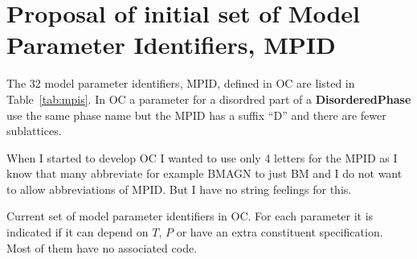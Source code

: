 \documentclass{article}
\begin{document}
\begin{appendices}
{\begin{verbatim}
\end{verbatim}
}

\newpage 

\setcounter{equation}{0}
\renewcommand{\theequation}{C\arabic{equation}}
\setcounter{figure}{0}
\renewcommand{\thefigure}{C\arabic{figure}}

\section{Proposal of initial set of Model Parameter Identifiers, MPID}\label{sec:mpid2}

The 32 model parameter identifiers, MPID, defined in OC are listed in
Table~\ref{tab:mpis}.  In OC a parameter for a disordred part of a
{\bf DisorderedPhase} use the same phase name but the MPID has a
suffix ``D'' and there are fewer sublattices.

When I started to develop OC I wanted to use only 4 letters for the
MPID as I know that many abbreviate for example BMAGN to just BM and I
do not want to allow abbreviations of MPID.  But I have no string
feelings for this.

\begin{table}[!h]
  \caption{Current set of model parameter identifiers in OC.  For each
    parameter it is indicated if it can depend on $T$, $P$ or have an
    extra constituent specification.  Most of them have no associated
    code.}\label{tab:mpis}


\end{table}
\end{appendices}
\end{document}
